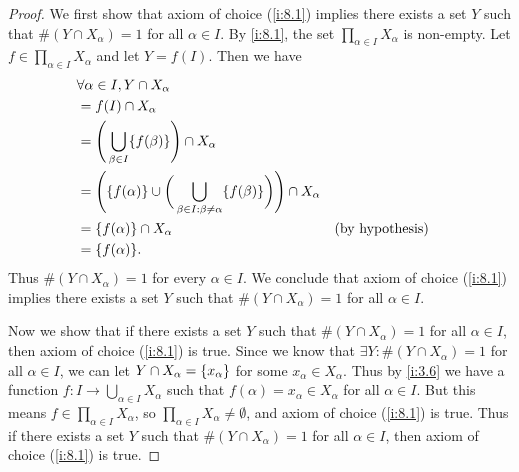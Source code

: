 \begin{proof}
  We first show that axiom of choice (\cref{i:8.1}) implies there exists a set \(Y\) such that \(\#(Y \cap X_{\alpha}) = 1\) for all \(\alpha \in I\).
  By \cref{i:8.1}, the set \(\prod_{\alpha \in I} X_{\alpha}\) is non-empty.
  Let \(f \in \prod_{\alpha \in I} X_{\alpha}\) and let \(Y = f(I)\).
  Then we have
  \begin{align*}
     & \forall \alpha \in I, Y \cap X_{\alpha}                                                                                                             \\
     & = f(I) \cap X_{\alpha}                                                                                                                              \\
     & = \Bigg(\bigcup_{\beta \in I} \set{f(\beta)}\Bigg) \cap X_{\alpha}                                                                                  \\
     & = \Bigg(\set{f(\alpha)} \cup \bigg(\bigcup_{\beta \in I : \beta \neq \alpha} \set{f(\beta)}\bigg)\Bigg) \cap X_{\alpha}                             \\
     & = \set{f(\alpha)} \cap X_{\alpha}                                                                                       &  & \text{(by hypothesis)} \\
     & = \set{f(\alpha)}.
  \end{align*}
  Thus \(\#(Y \cap X_{\alpha}) = 1\) for every \(\alpha \in I\).
  We conclude that axiom of choice (\cref{i:8.1}) implies there exists a set \(Y\) such that \(\#(Y \cap X_{\alpha}) = 1\) for all \(\alpha \in I\).

  Now we show that if there exists a set \(Y\) such that \(\#(Y \cap X_{\alpha}) = 1\) for all \(\alpha \in I\), then axiom of choice (\cref{i:8.1}) is true.
  Since we know that \(\exists Y : \#(Y \cap X_{\alpha}) = 1\) for all \(\alpha \in I\), we can let \(Y \cap X_{\alpha} = \left\lbrace x_{\alpha}\right\rbrace\) for some \(x_{\alpha} \in X_{\alpha}\).
  Thus by \cref{i:3.6} we have a function \(f : I \to \bigcup_{\alpha \in I} X_{\alpha}\) such that \(f(\alpha) = x_{\alpha} \in X_{\alpha}\) for all \(\alpha \in I\).
  But this means \(f \in \prod_{\alpha \in I} X_{\alpha}\), so \(\prod_{\alpha \in I} X_{\alpha} \neq \emptyset\), and axiom of choice (\cref{i:8.1}) is true.
  Thus if there exists a set \(Y\) such that \(\#(Y \cap X_{\alpha}) = 1\) for all \(\alpha \in I\), then axiom of choice (\cref{i:8.1}) is true.
\end{proof}

